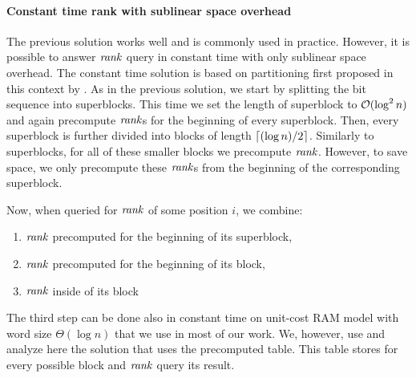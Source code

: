 \paragraph{Constant time rank with sublinear space overhead}

The previous solution works well and is commonly used in practice. However, it is possible to
answer $\mathit{rank}$ query in constant time with only sublinear space overhead. The constant time
solution is based on partitioning first proposed in this context by \cite{okanohara2007practical}.
As in the previous solution, we start by splitting the bit sequence into superblocks. This time
we set the length of superblock to $\mathcal{O}(\log^2 n)$ and again precompute $\mathit{rank}$s for the beginning of
every superblock. Then, every superblock is further divided into blocks of length $\left\lceil (\log n)/2 \right\rceil$.
Similarly to superblocks, for all of these smaller blocks we precompute $\mathit{rank}$. However, to save space,
we only precompute these $\mathit{rank}$s from the beginning of the corresponding superblock.

Now, when queried for $\mathit{rank}$ of some position $i$, we combine:
\begin{enumerate}
    \item $\mathit{rank}$ precomputed for the beginning of its superblock,
    \item $\mathit{rank}$ precomputed for the beginning of its block,
    \item $\mathit{rank}$ inside of its block
\end{enumerate}

The third step can be done also in constant time on unit-cost RAM model with word size $\Theta(\log n)$
that we use in most of our work. We, however, use and analyze here the solution that uses the precomputed table.
This table stores for every possible block and $\mathit{rank}$ query its result. 

